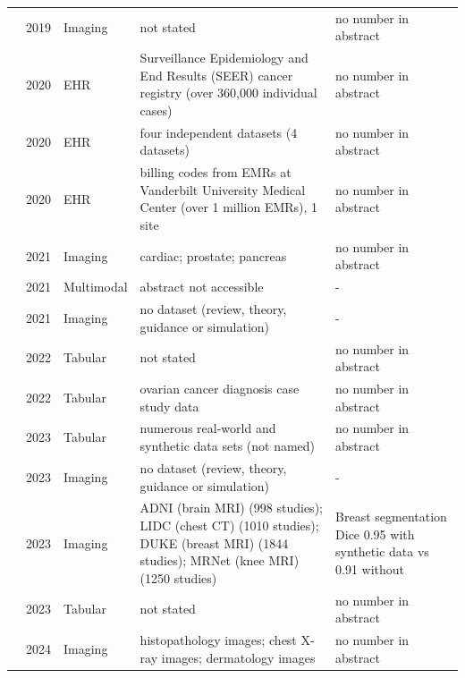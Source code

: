 \begin{longtable}{@{}p{2.6cm}p{0.7cm}p{1.2cm}p{4.4cm}p{4.6cm}@{}}
\cite{zhao2019data} & 2019 & Imaging & not stated & no number in abstract\\
\cite{goncalves2020generation} & 2020 & EHR & Surveillance Epidemiology and End Results (SEER) cancer registry (over 360,000 individual cases) & no number in abstract\\
\cite{yoon2020anonymization} & 2020 & EHR & four independent datasets (4 datasets) & no number in abstract\\
\cite{zhang2020ensuring} & 2020 & EHR & billing codes from EMRs at Vanderbilt University Medical Center (over 1 million EMRs), 1 site & no number in abstract\\
\cite{chaitanya2021semi} & 2021 & Imaging & cardiac; prostate; pancreas & no number in abstract\\
\cite{chen2021synthetic} & 2021 & Multimodal & abstract not accessible & -\\
\cite{chlap2021review} & 2021 & Imaging & no dataset (review, theory, guidance or simulation) & -\\
\cite{stadler2022synthetic} & 2022 & Tabular & not stated & no number in abstract\\
\cite{goorbergh2022harm} & 2022 & Tabular & ovarian cancer diagnosis case study data & no number in abstract\\
\cite{borisov2023language} & 2023 & Tabular & numerous real-world and synthetic data sets (not named) & no number in abstract\\
\cite{kazerouni2023diffusion} & 2023 & Imaging & no dataset (review, theory, guidance or simulation) & -\\
\cite{khader2023denoising} & 2023 & Imaging & ADNI (brain MRI) (998 studies); LIDC (chest CT) (1010 studies); DUKE (breast MRI) (1844 studies); MRNet (knee MRI) (1250 studies) & Breast segmentation Dice 0.95 with synthetic data vs 0.91 without\\
\cite{kotelnikov2023tabddpm} & 2023 & Tabular & not stated & no number in abstract\\
\cite{ktena2024generative} & 2024 & Imaging & histopathology images; chest X-ray images; dermatology images & no number in abstract\\
\bottomrule
\end{longtable}

